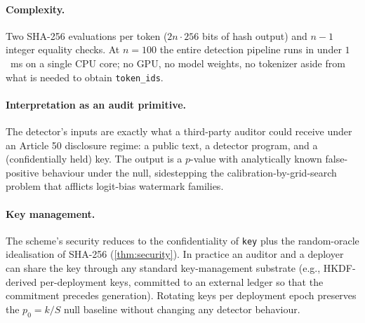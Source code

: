 \paragraph{Complexity.} Two SHA-256 evaluations per token
($2n \cdot 256$ bits of hash output) and $n-1$ integer equality
checks. At $n = 100$ the entire detection pipeline runs in under
$1$~ms on a single CPU core; no GPU, no model weights, no tokenizer
aside from what is needed to obtain \texttt{token\_ids}.

\paragraph{Interpretation as an audit primitive.} The detector's
inputs are exactly what a third-party auditor could receive under an
Article 50 disclosure regime: a public text, a detector program, and
a (confidentially held) key. The output is a $p$-value with
analytically known false-positive behaviour under the null,
sidestepping the calibration-by-grid-search problem that afflicts
logit-bias watermark families.

\paragraph{Key management.} The scheme's security reduces to the
confidentiality of \texttt{key} plus the random-oracle idealisation
of SHA-256 (\autoref{thm:security}). In practice an auditor and a
deployer can share the key through any standard key-management
substrate (e.g., HKDF-derived per-deployment keys, committed to an
external ledger so that the commitment precedes generation). Rotating
keys per deployment epoch preserves the $p_0 = k/S$ null baseline
without changing any detector behaviour.
